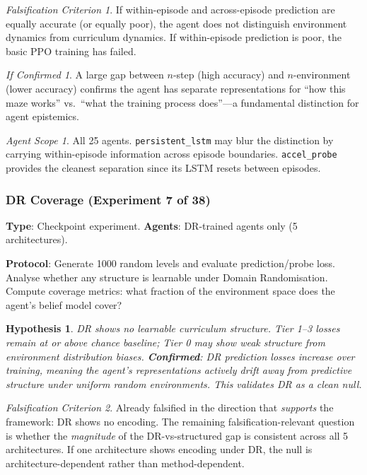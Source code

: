 \documentclass[11pt,a4paper]{article}
\newtheorem{hypothesis}{Hypothesis}[subsection]
\theoremstyle{remark}
\newtheorem*{falsification}{Falsification Criterion}
\newtheorem*{implication}{If Confirmed}
\newtheorem*{agentscope}{Agent Scope}
\begin{document}
\begin{falsification}
If within-episode and across-episode prediction are equally accurate (or equally poor), the agent does not distinguish environment dynamics from curriculum dynamics. If within-episode prediction is poor, the basic PPO training has failed.
\end{falsification}

\begin{implication}
A large gap between $n$-step (high accuracy) and $n$-environment (lower accuracy) confirms the agent has separate representations for ``how this maze works'' vs.\ ``what the training process does''---a fundamental distinction for agent epistemics.
\end{implication}

\begin{agentscope}
All 25 agents. \texttt{persistent\_lstm} may blur the distinction by carrying within-episode information across episode boundaries. \texttt{accel\_probe} provides the cleanest separation since its LSTM resets between episodes.
\end{agentscope}

\subsubsection{DR Coverage (Experiment 7 of 38)}
\label{exp:dr_coverage}

\textbf{Type}: Checkpoint experiment. \textbf{Agents}: DR-trained agents only (5 architectures).

\textbf{Protocol}: Generate 1000 random levels and evaluate prediction/probe loss. Analyse whether any structure is learnable under Domain Randomisation. Compute coverage metrics: what fraction of the environment space does the agent's belief model cover?

\begin{hypothesis}
DR shows no learnable curriculum structure. Tier 1--3 losses remain at or above chance baseline; Tier 0 may show weak structure from environment distribution biases. \textbf{Confirmed}: DR prediction losses \textit{increase} over training, meaning the agent's representations actively drift away from predictive structure under uniform random environments. This validates DR as a clean null.
\end{hypothesis}

\begin{falsification}
Already falsified in the direction that \textit{supports} the framework: DR shows no encoding. The remaining falsification-relevant question is whether the \textit{magnitude} of the DR-vs-structured gap is consistent across all 5 architectures. If one architecture shows encoding under DR, the null is architecture-dependent rather than method-dependent.
\end{falsification}
\end{document}
